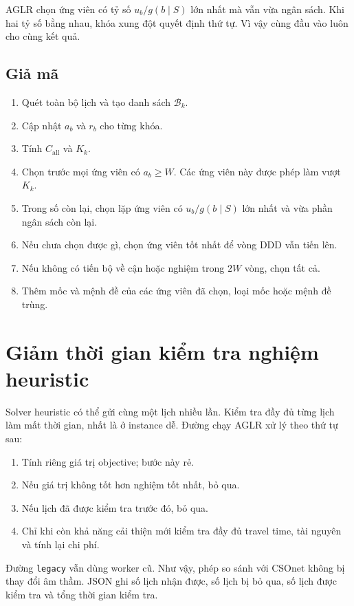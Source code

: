 \documentclass[11pt,a4paper]{article}
\newcommand{\code}[1]{\texttt{#1}}
\begin{document}
AGLR chọn ứng viên có tỷ số $u_b/g(b\mid S)$ lớn nhất mà vẫn vừa ngân sách. Khi
hai tỷ số bằng nhau, khóa xung đột quyết định thứ tự. Vì vậy cùng đầu vào luôn
cho cùng kết quả.

\subsection{Giả mã}

\begin{enumerate}
\item Quét toàn bộ lịch và tạo danh sách $\mathcal B_k$.
\item Cập nhật $a_b$ và $r_b$ cho từng khóa.
\item Tính $C_{\mathrm{all}}$ và $K_k$.
\item Chọn trước mọi ứng viên có $a_b\ge W$. Các ứng viên này được phép làm
      vượt $K_k$.
\item Trong số còn lại, chọn lặp ứng viên có $u_b/g(b\mid S)$ lớn nhất và vừa
      phần ngân sách còn lại.
\item Nếu chưa chọn được gì, chọn ứng viên tốt nhất để vòng DDD vẫn tiến lên.
\item Nếu không có tiến bộ về cận hoặc nghiệm trong $2W$ vòng, chọn tất cả.
\item Thêm mốc và mệnh đề của các ứng viên đã chọn, loại mốc hoặc mệnh đề trùng.
\end{enumerate}

\section{Giảm thời gian kiểm tra nghiệm heuristic}

Solver heuristic có thể gửi cùng một lịch nhiều lần. Kiểm tra đầy đủ từng lịch
làm mất thời gian, nhất là ở instance dễ. Đường chạy AGLR xử lý theo thứ tự sau:

\begin{enumerate}
\item Tính riêng giá trị objective; bước này rẻ.
\item Nếu giá trị không tốt hơn nghiệm tốt nhất, bỏ qua.
\item Nếu lịch đã được kiểm tra trước đó, bỏ qua.
\item Chỉ khi còn khả năng cải thiện mới kiểm tra đầy đủ travel time, tài nguyên
      và tính lại chi phí.
\end{enumerate}

Đường \code{legacy} vẫn dùng worker cũ. Như vậy, phép so sánh với CSOnet không
bị thay đổi âm thầm. JSON ghi số lịch nhận được, số lịch bị bỏ qua, số lịch được
kiểm tra và tổng thời gian kiểm tra.
\end{document}
